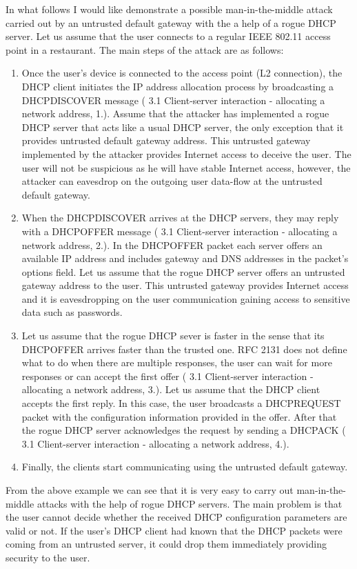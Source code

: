 \documentclass[letterpaper, 10 pt, conference]{ieeeconf}  %
\begin{document}
In what follows I would like demonstrate a possible man-in-the-middle attack carried out by an untrusted default gateway with the a help of a rogue DHCP server. Let us assume that the user connects to a regular IEEE 802.11 access point in a restaurant. The main steps of the attack are as follows:
\begin{enumerate}
\item Once the user's device is connected to the access point (L2 connection), the DHCP client initiates the IP address allocation process by broadcasting a DHCPDISCOVER message (\cite{dhcprfc} 3.1 Client-server interaction - allocating a network address, 1.). Assume that the attacker has implemented a rogue DHCP server that acts like a usual DHCP server, the only exception that it provides untrusted default gateway address. This untrusted gateway implemented by the attacker provides Internet access to deceive the user. The user will not be suspicious as he will have stable Internet access, however, the attacker can eavesdrop on the outgoing user data-flow at the untrusted default gateway.
\item When the DHCPDISCOVER arrives at the DHCP servers, they may reply with a DHCPOFFER message (\cite{dhcprfc} 3.1 Client-server interaction - allocating a network address, 2.). In the DHCPOFFER packet each server offers an available IP address and includes gateway and DNS addresses in the packet's options field. Let us assume that the rogue DHCP server offers an untrusted gateway address to the user. This untrusted gateway provides Internet access and it is eavesdropping on the user communication gaining access to sensitive data such as passwords.
\item Let us assume that the rogue DHCP sever is faster in the sense that its DHCPOFFER arrives faster than the trusted one. RFC 2131 does not define what to do when there are multiple responses, the user can wait for more responses or can accept the first offer (\cite{dhcprfc} 3.1 Client-server interaction - allocating a network address, 3.). Let us assume that the DHCP client accepts the first reply. In this case, the user broadcasts a DHCPREQUEST packet with the configuration information provided in the offer. After that the rogue DHCP server acknowledges the request by sending a DHCPACK (\cite{dhcprfc} 3.1 Client-server interaction - allocating a network address, 4.).
\item Finally, the clients start communicating using the untrusted default gateway.
\end{enumerate}
From the above example we can see that it is very easy to carry out man-in-the-middle attacks with the help of rogue DHCP servers. The main problem is that the user cannot decide whether the received DHCP configuration parameters are valid or not. If the user's DHCP client had known that the DHCP packets were coming from an untrusted server, it could drop them immediately providing security to the user.
\end{document}
